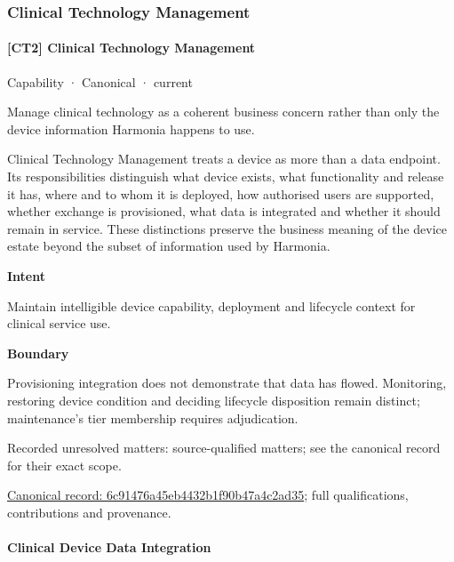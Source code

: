 \subsubsection{Clinical Technology Management}

\paragraph{[CT2] Clinical Technology Management}

\label{element:6c91476a45eb4432b1f90b47a4c2ad35}
{\small Capability · Canonical · current}\par

Manage clinical technology as a coherent business concern rather than only the device information Harmonia happens to use.



Clinical Technology Management treats a device as more than a data endpoint. Its responsibilities distinguish what device exists, what functionality and release it has, where and to whom it is deployed, how authorised users are supported, whether exchange is provisioned, what data is integrated and whether it should remain in service. These distinctions preserve the business meaning of the device estate beyond the subset of information used by Harmonia.



\textbf{Intent}



Maintain intelligible device capability, deployment and lifecycle context for clinical service use.



\textbf{Boundary}



Provisioning integration does not demonstrate that data has flowed. Monitoring, restoring device condition and deciding lifecycle disposition remain distinct; maintenance's tier membership requires adjudication.


{\small Recorded unresolved matters: source-qualified matters; see the canonical record for their exact scope.}\par
{\footnotesize \href{../../../../continuum/strategy/capability/6c91476a45eb4432b1f90b47a4c2ad35.md}{Canonical record: 6c91476a45eb4432b1f90b47a4c2ad35}; full qualifications, contributions and provenance.}\par
\paragraph{Clinical Device Data Integration}

